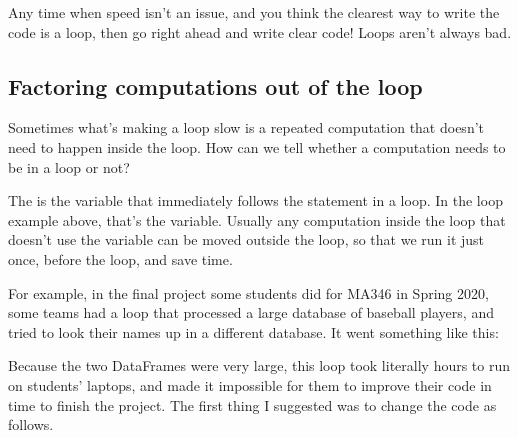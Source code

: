 \documentclass[letterpaper,10pt,english]{jupyterBook}
\begin{document}
\sphinxAtStartPar
Any time when speed isn’t an issue, and you think the clearest way to write the code is a loop, then go right ahead and write clear code!  Loops aren’t always bad.


\subsection{Factoring computations out of the loop}
\label{\detokenize{chapter-11-processing-rows:factoring-computations-out-of-the-loop}}
\sphinxAtStartPar
Sometimes what’s making a loop slow is a repeated computation that doesn’t need to happen inside the loop.  How can we tell whether a computation needs to be in a loop or not?

\sphinxAtStartPar
The  is the variable that immediately follows the  statement in a loop.  In the loop example above, that’s the  variable.  Usually any computation inside the loop that doesn’t use the  variable can be moved outside the loop, so that we run it just once, before the loop, and save time.

\sphinxAtStartPar
For example, in the final project some students did for MA346 in Spring 2020, some teams had a loop that processed a large database of baseball players, and tried to look their names up in a different database.  It went something like this:

\begin{sphinxVerbatim}[commandchars=\\\{\}]
   \PYG{p}{[}\PYG{p}{]}
       \PYG{p}{[}\PYG{p}{]}
\end{sphinxVerbatim}

\sphinxAtStartPar
Because the two DataFrames were very large, this loop took literally hours to run on students’ laptops, and made it impossible for them to improve their code in time to finish the project.  The first thing I suggested was to change the code as follows.

\begin{sphinxVerbatim}[commandchars=\\\{\}]
   \PYG{p}{[}\PYG{p}{]}
       \PYG{p}{[}\PYG{p}{]}
\end{sphinxVerbatim}
\end{document}
